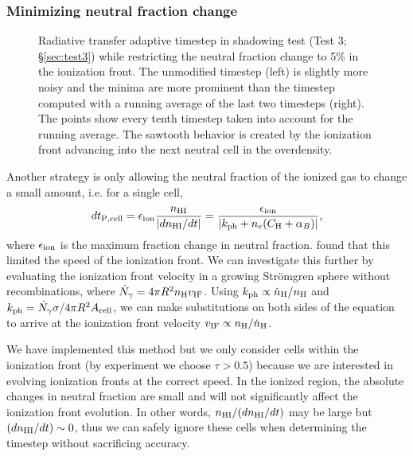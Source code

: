 \documentclass[12pt,preprint]{aastex}
\begin{document}
\subsubsection{Minimizing neutral fraction change}
\label{sec:dt_hi}

\begin{figure}[t]
  \caption{\label{fig:dtsmooth} Radiative transfer adaptive timestep
    in shadowing test (Test 3; \S\ref{sec:test3}) while restricting
    the neutral fraction change to 5\% in the ionization front.  The
    unmodified timestep (left) is slightly more noisy and the minima
    are more prominent than the timestep computed with a running
    average of the last two timesteps (right).  The points show every
    tenth timestep taken into account for the running average.  The
    sawtooth behavior is created by the ionization front advancing
    into the next neutral cell in the overdensity.}
\end{figure}

Another strategy is only allowing the neutral fraction of the ionized
gas to change a small amount, i.e. for a single cell,
%
\begin{equation}
  \label{eqn:dtelec}
  dt_{\rm P,cell} = \epsilon_{\rm ion} \frac{n_{\rm HI}}{|dn_{\rm HI}/dt|} =
  \frac{\epsilon_{\rm ion}}{|k_{\rm ph} + n_e (C_{\rm H} + \alpha_B)|},
\end{equation}
where $\epsilon_{\rm ion}$ is the maximum fraction change in neutral
fraction.  \citet{Shapiro04} found that this limited the speed of the
ionization front.  We can investigate this further by evaluating the
ionization front velocity in a growing Str\"{o}mgren sphere without
recombinations, where $\dot{N}_\gamma = 4 \pi R^2 n_{\rm H} v_{\rm
  IF}$.  Using $\kph \propto \dot{n}_{\rm H} / n_{\rm H}$ and $\kph =
\dot{N}_\gamma \sigma / 4\pi R^2 A_{\rm cell}$, we can make
substitutions on both sides of the equation to arrive at the
ionization front velocity $v_{\rm IF} \propto n_{\rm H} /\dot{n}_{\rm
  H}$.  

We have implemented this method but we only consider cells within the
ionization front (by experiment we choose $\tau > 0.5$) because we are
interested in evolving ionization fronts at the correct speed.  In the
ionized region, the absolute changes in neutral fraction are small and
will not significantly affect the ionization front evolution.  In
other words, $n_{\rm HI}/(dn_{\rm HI}/dt)$ may be large but $(dn_{\rm
  HI}/dt) \sim 0$, thus we can safely ignore these cells when
determining the timestep without sacrificing accuracy.
\end{document}
